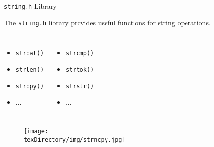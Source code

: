 \documentclass[compress]{beamer}
\begin{document}
\begin{slide}
	\begin{block}{\texttt{string.h} Library}

	The \texttt{string.h} library provides useful functions for string operations.

	\begin{columns}
	\begin{itemize}
	\item[] \texttt{strcat()}
	\item[] \texttt{strlen()}
	\item[] \texttt{strcpy()}
	\item[] ...
	\end{itemize}
	\begin{itemize}
	\item[] \texttt{strcmp()}
	\item[] \texttt{strtok()}
	\item[] \texttt{strstr()}
	\item[] ...
	\end{itemize}
	\end{columns}

	\end{block}
\end{slide}

\begin{slide}
	\begin{figure}
	\texttt{[image: \\texDirectory/img/strncpy.jpg]}
	\end{figure}
\end{slide}
\end{document}
